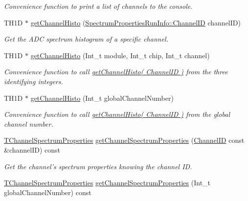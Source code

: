 \begin{DoxyCompactItemize}
\begin{DoxyCompactList}\small\item\em Convenience function to print a list of channels to the console. \end{DoxyCompactList}\item 
T\-H1\-D $\ast$ \hyperlink{class_spectrum_properties_run_info_a7465313bd615a37ae548fecb6d2b11df}{get\-Channel\-Histo} (\hyperlink{class_spectrum_properties_run_info_1_1_channel_i_d}{Spectrum\-Properties\-Run\-Info\-::\-Channel\-I\-D} channel\-I\-D)
\begin{DoxyCompactList}\small\item\em Get the A\-D\-C spectrum histogram of a specific channel. \end{DoxyCompactList}\item 
T\-H1\-D $\ast$ \hyperlink{class_spectrum_properties_run_info_a62d810cc68f737fc7504bc0efdbb1a32}{get\-Channel\-Histo} (Int\-\_\-t module, Int\-\_\-t chip, Int\-\_\-t channel)
\begin{DoxyCompactList}\small\item\em Convenience function to call \hyperlink{class_spectrum_properties_run_info_a7465313bd615a37ae548fecb6d2b11df}{get\-Channel\-Histo( Channel\-I\-D )} from the three identifying integers. \end{DoxyCompactList}\item 
T\-H1\-D $\ast$ \hyperlink{class_spectrum_properties_run_info_a3674726bcbfef46f67f6c280de88457f}{get\-Channel\-Histo} (Int\-\_\-t global\-Channel\-Number)
\begin{DoxyCompactList}\small\item\em Convenience function to call \hyperlink{class_spectrum_properties_run_info_a7465313bd615a37ae548fecb6d2b11df}{get\-Channel\-Histo( Channel\-I\-D )} from the global channel number. \end{DoxyCompactList}\item 
\hyperlink{class_t_channel_spectrum_properties}{T\-Channel\-Spectrum\-Properties} \hyperlink{class_spectrum_properties_run_info_a95e79ffad497b11ae35155f516ef7c9b}{get\-Channel\-Spectrum\-Properties} (\hyperlink{class_spectrum_properties_run_info_1_1_channel_i_d}{Channel\-I\-D} const \&channel\-I\-D) const 
\begin{DoxyCompactList}\small\item\em Get the channel's spectrum properties knowing the channel I\-D. \end{DoxyCompactList}\item 
\hyperlink{class_t_channel_spectrum_properties}{T\-Channel\-Spectrum\-Properties} \hyperlink{class_spectrum_properties_run_info_aa3a3a6c0169bffdc12b9940cd085344c}{get\-Channel\-Spectrum\-Properties} (Int\-\_\-t global\-Channel\-Number) const 

\end{DoxyCompactItemize}

